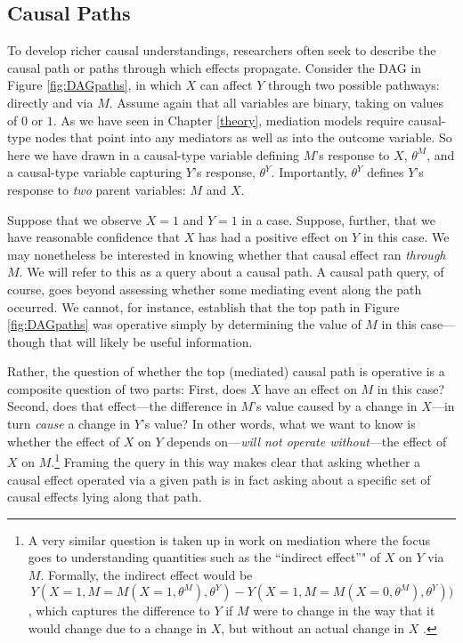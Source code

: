 \documentclass[12pt,]{book}
\let\rmarkdownfootnote\footnote%
\def\footnote{\protect\rmarkdownfootnote}
\begin{document}
\hypertarget{causal-paths}{%
\subsection{Causal Paths}\label{causal-paths}}

To develop richer causal understandings, researchers often seek to describe the causal path or paths through which effects propagate. Consider the DAG in Figure \ref{fig:DAGpaths}, in which \(X\) can affect \(Y\) through two possible pathways: directly and via \(M\). Assume again that all variables are binary, taking on values of \(0\) or \(1\). As we have seen in Chapter \ref{theory}, mediation models require causal-type nodes that point into any mediators as well as into the outcome variable. So here we have drawn in a causal-type variable defining \(M\)'s response to \(X\), \(\theta^M\), and a causal-type variable capturing \(Y\)'s response, \(\theta^Y\). Importantly, \(\theta^Y\) defines \(Y\)'s response to \emph{two} parent variables: \(M\) and \(X\).

Suppose that we observe \(X=1\) and \(Y=1\) in a case. Suppose, further, that we have reasonable confidence that \(X\) has had a positive effect on \(Y\) in this case. We may nonetheless be interested in knowing whether that causal effect ran \emph{through} \(M\). We will refer to this as a query about a causal path. A causal path query, of course, goes beyond assessing whether some mediating event along the path occurred. We cannot, for instance, establish that the top path in Figure \ref{fig:DAGpaths} was operative simply by determining the value of \(M\) in this case---though that will likely be useful information.

Rather, the question of whether the top (mediated) causal path is operative is a composite question of two parts: First, does \(X\) have an effect on \(M\) in this case? Second, does that effect---the difference in \(M\)'s value caused by a change in \(X\)---in turn \emph{cause} a change in \(Y\)'s value? In other words, what we want to know is whether the effect of \(X\) on \(Y\) depends on---\emph{will not operate without}---the effect of \(X\) on \(M\).\footnote{A very similar question is taken up in work on mediation where the focus goes to understanding quantities such as the ``indirect effect''" of \(X\) on \(Y\) via \(M\). Formally, the indirect effect would be \[Y(X=1, M = M(X=1,\theta^M), 
  \theta^Y) - Y(X = 1, M = M(X=0, \theta^M), \theta^Y))\], which captures the difference to \(Y\) if \(M\) were to change in the way that it would change due to a change in \(X\), but without an actual change in \(X\) \citep[ p 132, \citet{imai2010general}]{pearl2009causality}.} Framing the query in this way makes clear that asking whether a causal effect operated via a given path is in fact asking about a specific set of causal effects lying along that path.
\end{document}

